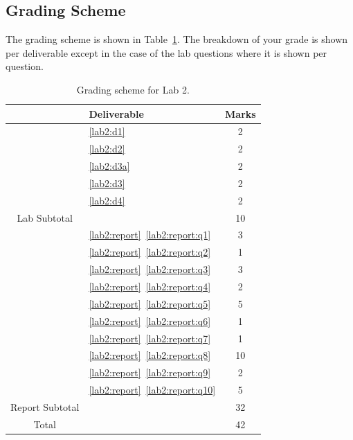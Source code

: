 \subsection{Grading Scheme}
The grading scheme is shown in Table~\ref{tab:lab2:grading}. The breakdown of
your grade is shown per deliverable except in the case of the lab
questions where it is shown per question.
%
\begin{table}
\centering
\begin{tabular}{c|l|c}
        & Deliverable           & Marks  \\ \hline
        & \ref{lab2:d1}         & 2       \\ \hline
        & \ref{lab2:d2}         & 2       \\ \hline
        & \ref{lab2:d3a}        & 2       \\ \hline
        & \ref{lab2:d3}         & 2       \\ \hline
        & \ref{lab2:d4}         & 2       \\ \hhline{=|=|=}
Lab Subtotal&                       & 10      \\ \hhline{=|=|=}
        & \ref{lab2:report}~\ref{lab2:report:q1}  & 3       \\ \hline
        & \ref{lab2:report}~\ref{lab2:report:q2}  & 1       \\ \hline
        & \ref{lab2:report}~\ref{lab2:report:q3}  & 3       \\ \hline
        & \ref{lab2:report}~\ref{lab2:report:q4}  & 2       \\ \hline
        & \ref{lab2:report}~\ref{lab2:report:q5}  & 5      \\ \hline
        & \ref{lab2:report}~\ref{lab2:report:q6}  & 1       \\ \hline
        & \ref{lab2:report}~\ref{lab2:report:q7}  & 1       \\ \hline
        & \ref{lab2:report}~\ref{lab2:report:q8}  & 10      \\ \hline
        & \ref{lab2:report}~\ref{lab2:report:q9}  & 2       \\ \hline
        & \ref{lab2:report}~\ref{lab2:report:q10} & 5       \\ \hhline{=|=|=}
Report Subtotal&  & 32 \\ \hhline{=|=|=}
  Total &                       & 42
\end{tabular}
\caption[Grading Scheme for Lab 2]{Grading scheme for Lab 2.}
\label{tab:lab2:grading}
\end{table}
%
